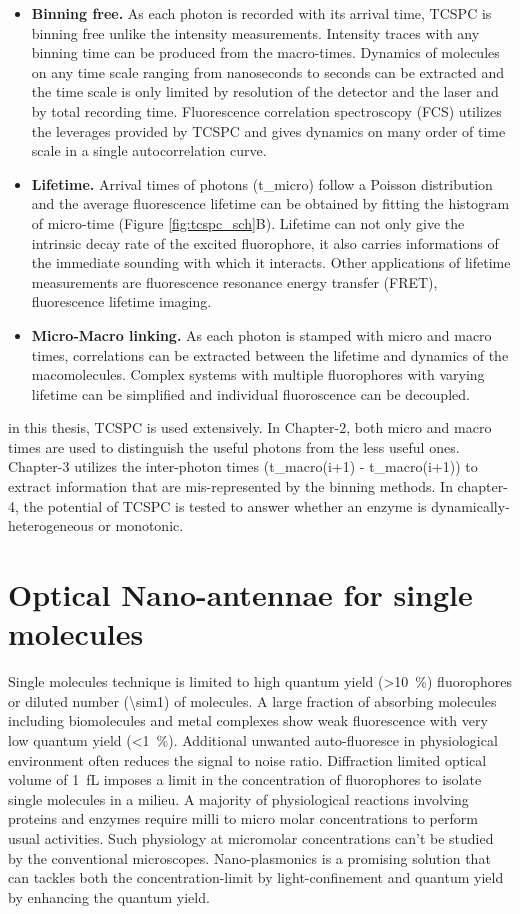\begin{itemize}
	\item \textbf{Binning free.} As each photon is recorded with its arrival time, TCSPC is binning free unlike the intensity measurements.
	Intensity traces with any binning time can be produced from the macro-times.
	Dynamics of molecules on any time scale ranging from nanoseconds to seconds can be extracted and the time scale is only limited by resolution of the detector and the laser and by total recording time.
	Fluorescence correlation spectroscopy (FCS) utilizes the leverages provided by TCSPC and gives dynamics on many order of time scale in a single autocorrelation curve.
	\item \textbf{Lifetime.} Arrival times of photons (t\_micro) follow a Poisson distribution and the average fluorescence lifetime can be obtained by fitting the histogram of micro-time (Figure \ref{fig:tcspc_sch}B).
	Lifetime can not only give the intrinsic decay rate of the excited fluorophore, it also carries informations of the immediate sounding with which it interacts.
	Other applications of lifetime measurements are fluorescence resonance energy transfer (FRET), fluorescence lifetime imaging.\cite{selvin2000the,lakowicz1992fluorescence} 
	\item \textbf{Micro-Macro linking.} As each photon is stamped with micro and macro times, correlations can be extracted between the lifetime and dynamics of the macomolecules.
	Complex systems with multiple fluorophores with varying lifetime can be simplified and individual fluoroscence can be decoupled.
\end{itemize}
in this thesis, TCSPC is used extensively.
In Chapter-2, both micro and macro times are used to distinguish the useful photons from the less useful ones.
Chapter-3 utilizes the inter-photon times (t\_macro(i+1) - t\_macro(i+1)) to extract information that are mis-represented by the binning methods.
In chapter-4, the potential of TCSPC is tested to answer whether an enzyme is dynamically-heterogeneous or monotonic. 
%
\section{Optical Nano-antennae for single molecules}
Single molecules technique is limited to high quantum yield (\SI{>10}{\percent}) fluorophores or diluted number (\SI{\sim1}{\nM}) of molecules.
A large fraction of absorbing molecules including biomolecules and metal complexes show weak fluorescence with very low quantum yield (\SI{<1}{\percent}).
Additional unwanted auto-fluoresce in physiological environment often reduces the signal to noise ratio.
Diffraction limited optical volume of \SI{1}{fL} imposes a limit in the concentration of fluorophores to isolate single molecules in a milieu.
A majority of physiological reactions involving proteins and enzymes require milli to micro molar concentrations to perform usual activities.\cite{craighead2006future,punj2013gold,fabrizio2016roadmap,punj2014thesis}
Such physiology at micromolar concentrations can't be studied by the conventional microscopes.
Nano-plasmonics is a promising solution that can tackles both the concentration-limit by light-confinement and quantum yield by enhancing the quantum yield.

